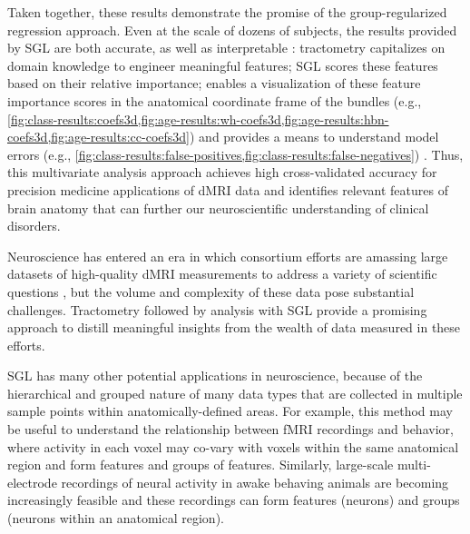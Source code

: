 \documentclass[10pt,%
               aps,%
               prl,%
               preprint,%
               superscriptaddress,%
               preprintnumbers,%
               amsmath,%
               floatfix,%
               endfloats*]{revtex4-1}
\begin{document}
Taken together, these results demonstrate the promise of the
group-regularized regression approach. Even at the scale of dozens of
subjects, the results provided by SGL are both accurate, as well as
interpretable \cite{Murdoch2019-ax}: tractometry capitalizes on domain
knowledge to engineer meaningful features; SGL scores these features based on
their relative importance; enables a visualization of these feature
importance scores in the anatomical coordinate frame of the bundles (e.g.,
\cref{fig:class-results:coefs3d,fig:age-results:wh-coefs3d,fig:age-results:hbn-coefs3d,fig:age-results:cc-coefs3d})
and provides a means to understand model errors (e.g.,
\cref{fig:class-results:false-positives,fig:class-results:false-negatives}) .
Thus, this multivariate analysis approach achieves high
cross-validated accuracy for precision medicine applications of dMRI data and identifies relevant features of brain anatomy that can further our
neuroscientific understanding of clinical disorders.

Neuroscience has entered an era in which consortium efforts are amassing
large datasets of high-quality dMRI measurements to address a variety of
scientific questions \cite{jernigan2016ping, jernigan2018abcd,
alexander2017open, Miller2016-hw, VanEssen2012}, but the volume and
complexity of these data pose substantial challenges. Tractometry
followed by analysis with SGL provide a promising approach to
distill meaningful insights from the wealth of data measured in these efforts.

SGL has many other potential applications in neuroscience, because
of the hierarchical and grouped nature of many data types that are
collected in multiple sample points within anatomically-defined areas.
For example, this method may be useful to understand the relationship
between fMRI recordings and behavior, where activity in each voxel
may co-vary with voxels within the same anatomical region and form
features and groups of features. Similarly, large-scale multi-electrode
recordings of neural activity in awake behaving animals are becoming
increasingly feasible \cite{steinmetz2018distributed, Jun2017-gv} and
these recordings can form features (neurons) and groups (neurons within
an anatomical region).

\end{document}
